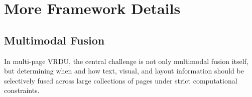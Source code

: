 \documentclass[11pt]{article}
\begin{document}
\section{More Framework Details}
\label{sec:framework-details}


\subsection{Multimodal Fusion}
\label{app:fusion}
In multi-page VRDU, the central challenge is not only multimodal fusion itself, but determining when and how text, visual, and layout information should be selectively fused across large collections of pages under strict computational constraints.
\end{document}

